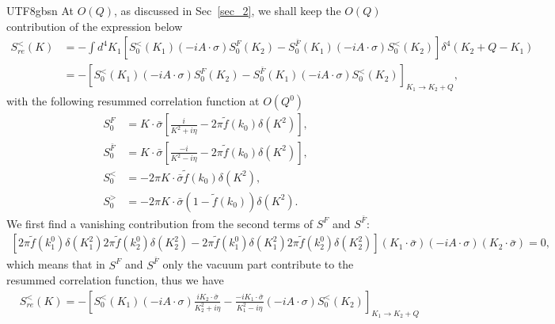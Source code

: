 \documentclass[11pt]{article}\def\baselinestretch{1.4}
\begin{document}
\begin{CJK}{UTF8}{gbsn}
At $O(Q)$, as discussed in Sec~\ref{sec_2}, we shall keep the $O(Q)$ contribution of the expression below
\begin{align}
S^<_{re}(K) &= -\int d^4K_1 \left[ S_0^<(K_1)(-iA\cdot \sigma )S_0^F(K_2)-S_0^{\bar{F}}(K_1)(-iA\cdot \sigma )S_0^<(K_2) \right] \delta ^4(K_2+Q-K_1) \nonumber\\
&= -\left[S_0^<(K_1)(-iA\cdot \sigma )S_0^F(K_2)-S_0^{\bar{F}}(K_1)(-iA\cdot \sigma )S_0^<(K_2)\right]_{K_1\to K_2+Q},
\end{align}
with the following resummed correlation function at $O(Q^0)$
\begin{equation}
\begin{aligned}
S^F_0 &= K\cdot \bar{\sigma}\left[ \frac{i}{K^2+i \eta }-2\pi \tilde{f}(k_0)\delta (K^2) \right] ,\\
S^{\bar{F}}_0 &= K\cdot \bar{\sigma}\left[ \frac{-i}{K^2-i \eta }-2\pi \tilde{f}(k_0)\delta (K^2) \right] ,\\
S^<_0 &= -2\pi K\cdot \bar{\sigma}\tilde{f}(k_0)\delta (K^2) ,\\
S^>_0 &= -2\pi K\cdot \bar{\sigma}(1-\tilde{f}(k_0))\delta (K^2).
\end{aligned}
\end{equation}
We first find a vanishing contribution from the second terms of $S^F$ and $S^{\bar{F}}$:
\begin{align}
\left[ 2\pi \tilde{f}(k_1^0)\delta (K_1^2)2\pi \tilde{f}(k_2^0)\delta (K_2^2)-2\pi \tilde{f}(k_1^0)\delta (K_1^2)2\pi \tilde{f}(k_2^0)\delta (K_2^2) \right](K_1 \cdot \bar{\sigma} )(-iA \cdot \sigma )(K_2 \cdot \bar{\sigma} ) = 0,
\end{align}
which means that in $S^F$ and $S^{\bar{F}}$ only the vacuum part contribute to the resummed correlation function, thus we have %
\begin{align}\label{resum_KMS}
&S^<_{re}(K) = -\left[S_0^<(K_1)(-iA\cdot \sigma )\frac{iK_2\cdot \bar{\sigma }}{K_2^2+i \eta }-\frac{-iK_1\cdot \bar{\sigma }}{K_1^2-i \eta }(-iA\cdot \sigma )S_0^<(K_2)\right]_{K_1\to K_2+Q}\nonumber\\

\end{align}
\end{CJK}
\end{document}
